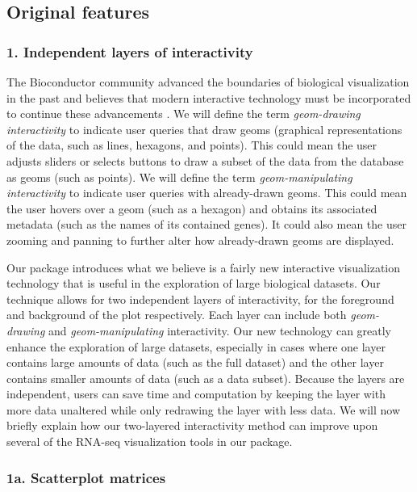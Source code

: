 \documentclass[parskip=full]{bmcart}
\begin{document}
\subsection*{Original features}

\subsubsection*{1. Independent layers of interactivity}

The Bioconductor community advanced the boundaries of biological visualization in the past and believes that modern interactive technology must be incorporated to continue these advancements \cite{gentleman2004bioconductor}. We will define the term \textit{geom-drawing interactivity} to indicate user queries that draw geoms (graphical representations of the data, such as lines, hexagons, and points). This could mean the user adjusts sliders or selects buttons to draw a subset of the data from the database as geoms (such as points). We will define the term \textit{geom-manipulating interactivity} to indicate user queries with already-drawn geoms. This could mean the user hovers over a geom (such as a hexagon) and obtains its associated metadata (such as the names of its contained genes). It could also mean the user zooming and panning to further alter how already-drawn geoms are displayed.

Our package introduces what we believe is a fairly new interactive visualization technology that is useful in the exploration of large biological datasets. Our technique allows for two independent layers of interactivity, for the foreground and background of the plot respectively. Each layer can include both \textit{geom-drawing} and \textit{geom-manipulating} interactivity. Our new technology can greatly enhance the exploration of large datasets, especially in cases where one layer contains large amounts of data (such as the full dataset) and the other layer contains smaller amounts of data (such as a data subset). Because the layers are independent, users can save time and computation by keeping the layer with more data unaltered while only redrawing the layer with less data. We will now briefly explain how our two-layered interactivity method can improve upon several of the RNA-seq visualization tools in our package. 

\subsubsection*{1a. Scatterplot matrices}
\end{document}
